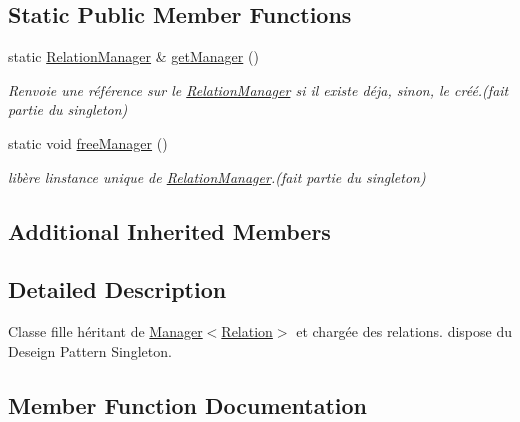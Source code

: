 \subsection*{Static Public Member Functions}
\begin{DoxyCompactItemize}
\item 
\mbox{\label{class_relation_manager_a525665dcd2599872667dd32f36506f41}} 
static \hyperlink{class_relation_manager}{Relation\+Manager} \& \hyperlink{class_relation_manager_a525665dcd2599872667dd32f36506f41}{get\+Manager} ()
\begin{DoxyCompactList}\small\item\em Renvoie une référence sur le \hyperlink{class_relation_manager}{Relation\+Manager} si il existe déja, sinon, le créé.(fait partie du singleton) \end{DoxyCompactList}\item 
\mbox{\label{class_relation_manager_a4c967c4473a2bd29ab558ebf74aed149}} 
static void \hyperlink{class_relation_manager_a4c967c4473a2bd29ab558ebf74aed149}{free\+Manager} ()
\begin{DoxyCompactList}\small\item\em libère l\textquotesingle{}instance unique de \hyperlink{class_relation_manager}{Relation\+Manager}.(fait partie du singleton) \end{DoxyCompactList}\end{DoxyCompactItemize}
\subsection*{Additional Inherited Members}


\subsection{Detailed Description}
Classe fille héritant de \hyperlink{class_manager}{Manager$<$\+Relation$>$} et chargée des relations. dispose du Deseign Pattern Singleton. 

\subsection{Member Function Documentation}
\mbox{\label{class_relation_manager_a2933861a9b973a35031e799ef9d369b5}} 
